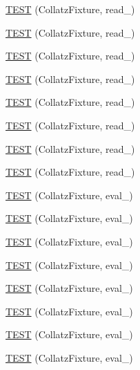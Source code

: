 \begin{DoxyCompactItemize}
\item 
\hyperlink{TestCollatz_8c_09_09_a66f4163404a0842f4f9eb6dcbfb35580}{T\-E\-S\-T} (Collatz\-Fixture, read\-\_)
\item 
\hyperlink{TestCollatz_8c_09_09_a3187ab2baa687bc11ef1402f3c5ac249}{T\-E\-S\-T} (Collatz\-Fixture, read\-\_)
\item 
\hyperlink{TestCollatz_8c_09_09_a910fd6352964fadd13f189dfb49f46f4}{T\-E\-S\-T} (Collatz\-Fixture, read\-\_)
\item 
\hyperlink{TestCollatz_8c_09_09_a0b5a76cb98b330891857af6177a4ee52}{T\-E\-S\-T} (Collatz\-Fixture, read\-\_)
\item 
\hyperlink{TestCollatz_8c_09_09_aa2d3f1b8554892f4930b617b4259625a}{T\-E\-S\-T} (Collatz\-Fixture, read\-\_)
\item 
\hyperlink{TestCollatz_8c_09_09_a589b47d5256ad73b8b982719d4785b4a}{T\-E\-S\-T} (Collatz\-Fixture, read\-\_)
\item 
\hyperlink{TestCollatz_8c_09_09_a705b17750340c6f47e29c1ef9bdbd36d}{T\-E\-S\-T} (Collatz\-Fixture, read\-\_)
\item 
\hyperlink{TestCollatz_8c_09_09_a639cf12d46edd97f48e925fb3c6ab8ad}{T\-E\-S\-T} (Collatz\-Fixture, read\-\_)
\item 
\hyperlink{TestCollatz_8c_09_09_aa0fcdadaf0d4f7fe0919c37746fe7c74}{T\-E\-S\-T} (Collatz\-Fixture, eval\-\_)
\item 
\hyperlink{TestCollatz_8c_09_09_a333bb6921f06fa177e9818dbcf3eda06}{T\-E\-S\-T} (Collatz\-Fixture, eval\-\_)
\item 
\hyperlink{TestCollatz_8c_09_09_a251001c75c1226c607534268ab3a5bcb}{T\-E\-S\-T} (Collatz\-Fixture, eval\-\_)
\item 
\hyperlink{TestCollatz_8c_09_09_a033aa388470c35adc9579303dba1afa2}{T\-E\-S\-T} (Collatz\-Fixture, eval\-\_)
\item 
\hyperlink{TestCollatz_8c_09_09_ab529bbfe532bd0b6fbc11c51fe0af7e5}{T\-E\-S\-T} (Collatz\-Fixture, eval\-\_)
\item 
\hyperlink{TestCollatz_8c_09_09_adebb7237f2a00c256cd0c733885ccd58}{T\-E\-S\-T} (Collatz\-Fixture, eval\-\_)
\item 
\hyperlink{TestCollatz_8c_09_09_a4428eb890eb2825bcd806812ccf3edc3}{T\-E\-S\-T} (Collatz\-Fixture, eval\-\_)
\item 
\hyperlink{TestCollatz_8c_09_09_ad31ddf657ad806c35457117d9a862a43}{T\-E\-S\-T} (Collatz\-Fixture, eval\-\_)
\item 

\end{DoxyCompactItemize}
